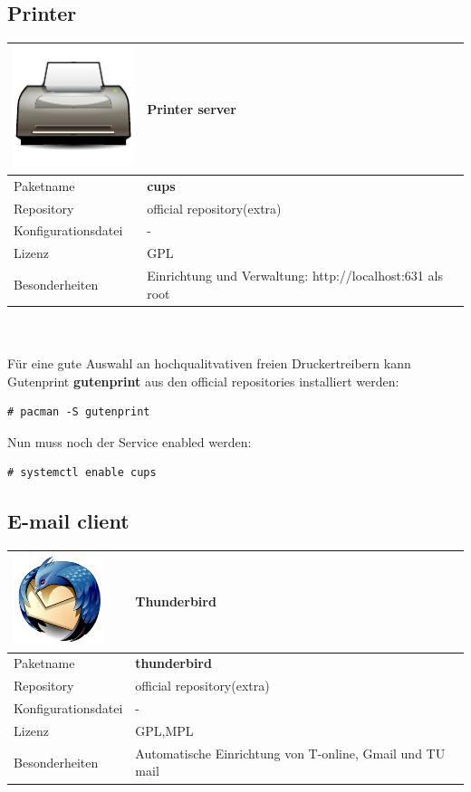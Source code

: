 \subsection{Printer}
\begin{tabular}{l|l}
\includegraphics[scale=0.75]{printer.pdf} & Printer server \\ \hline
Paketname & \textbf{cups} \\ 
Repository & official repository(extra) \\
Konfigurationsdatei & - \\
Lizenz & GPL \\
Besonderheiten & Einrichtung und Verwaltung: http://localhost:631 als root \\
\end{tabular}
\\ \\
Für eine gute Auswahl an hochqualitvativen freien Druckertreibern kann Gutenprint \textbf{gutenprint}
aus den official repositories installiert werden:
\begin{lstlisting}[style=Bash]
# pacman -S gutenprint 
\end{lstlisting}
Nun muss noch der Service enabled werden:
\begin{lstlisting}[style=Bash]
# systemctl enable cups
\end{lstlisting}

\subsection{E-mail client}
\begin{tabular}{l|l}
\includegraphics[scale=0.75]{thunderbird-logo.pdf} & Thunderbird \\ \hline
Paketname & \textbf{thunderbird} \\ 
Repository & official repository(extra) \\
Konfigurationsdatei & - \\
Lizenz & GPL,MPL \\
Besonderheiten & Automatische Einrichtung von T-online, Gmail und TU mail \\
\end{tabular}

